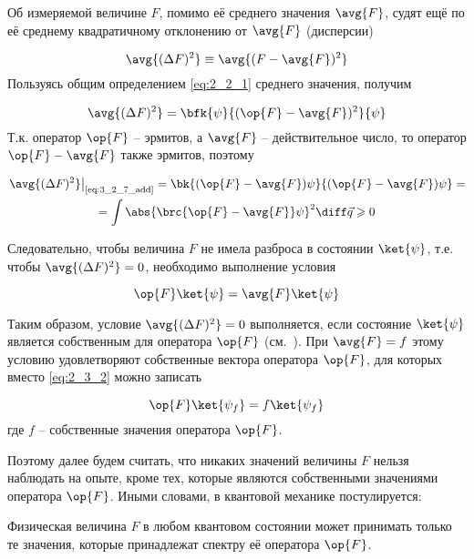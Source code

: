 Об измеряемой величине $F$, помимо её среднего значения $\avg{F}$, судят ещё по её среднему квадратичному отклонению от $\avg{F}$ (дисперсии)

\begin{equation}
\label{eq:3_2_10}
\avg{(\Delta F)^2} \equiv \avg{(F - \avg{F})^2}
\end{equation}%
%
Пользуясь общим определением \eqref{eq:2_2_1} среднего значения, получим

\begin{equation}
\label{eq:3_2_11}
\avg{(\Delta F)^2} = \bfk{\psi}{(\op{F} - \avg{F})^2}{\psi}
\end{equation}%
%
Т.к. оператор $\op{F}$ -- эрмитов, а $\avg{F}$ -- действительное число, то оператор $\op{F} - \avg{F}$ также эрмитов, поэтому

\begin{equation}
\label{eq:3_2_12}
\begin{gathered}
\left. \avg{(\Delta F)^2} \right|_{\text{\eqref{eq:3_2_7_add}}} =
  \bk{(\op{F} - \avg{F})\psi}{(\op{F} - \avg{F})\psi} = \\ =
  \int \abs{\brc{\op{F} - \avg{F}}\psi}^2\diff\vec{q} \geqslant 0
\end{gathered}
\end{equation}

Следовательно, чтобы величина $F$ не имела разброса в состоянии $\ket{\psi}$, т.е. чтобы $\avg{(\Delta F)^2} = 0$, необходимо выполнение условия

\begin{equation}
\label{eq:3_2_13}
\op{F}\ket{\psi} = \avg{F}\ket{\psi}
\end{equation}

Таким образом, условие $\avg{(\Delta F)^2} = 0$ выполняется, если состояние $\ket{\psi}$ является собственным для оператора $\op{F}$ (см.~). При $\avg{F} = f$ этому условию удовлетворяют собственные вектора оператора $\op{F}$, для которых вместо \eqref{eq:2_3_2} можно записать

\begin{equation}
\label{eq:3_2_14}
\op{F}\ket{\psi_{f}} = f \ket{\psi_{f}}
\end{equation}%
%
где $f$ -- собственные значения оператора $\op{F}$.

Поэтому далее будем считать, что никаких значений величины $F$ нельзя наблюдать на опыте, кроме тех, которые являются собственными значениями оператора $\op{F}$. Иными словами, в квантовой механике постулируется:
\begin{stmt}
Физическая величина $F$ в любом квантовом состоянии может принимать только те значения, которые принадлежат спектру её оператора $\op{F}$.
\end{stmt}

